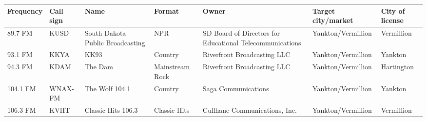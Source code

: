 \documentclass{article}
\begin{document}
\begin{tabular}{lllllll}
\toprule
Frequency & Call sign & Name & Format & Owner & Target city/market & City of license \\
\midrule
89.7 FM & KUSD & South Dakota Public Broadcasting & NPR & SD Board of Directors for Educational Telecommunications & Yankton/Vermillion & Vermillion \\
93.1 FM & KKYA & KK93 & Country & Riverfront Broadcasting LLC & Yankton/Vermillion & Yankton \\
94.3 FM & KDAM & The Dam & Mainstream Rock & Riverfront Broadcasting LLC & Yankton/Vermillion & Hartington \\
104.1 FM & WNAX-FM & The Wolf 104.1 & Country & Saga Communications & Yankton/Vermillion & Yankton \\
106.3 FM & KVHT & Classic Hits 106.3 & Classic Hits & Cullhane Communications, Inc. & Yankton/Vermillion & Vermillion \\
\bottomrule
\end{tabular}
\end{document}
